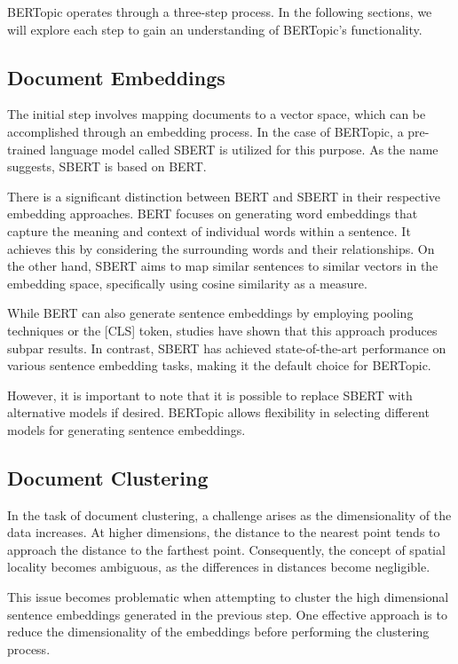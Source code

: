 \documentclass[a4paper,10pt]{report}
\begin{document}
BERTopic operates through a three-step process. In the following sections, we will explore each step to gain an understanding of BERTopic's functionality.

\subsection{Document Embeddings}
The initial step involves mapping documents to a vector space, which can be accomplished through an embedding process. In the case of BERTopic, a pre-trained language model called SBERT \cite{sbert} is utilized for this purpose. As the name suggests, SBERT is based on BERT.

There is a significant distinction between BERT and SBERT in their respective embedding approaches. BERT focuses on generating word embeddings that capture the meaning and context of individual words within a sentence. It achieves this by considering the surrounding words and their relationships. \cite{bert} On the other hand, SBERT aims to map similar sentences to similar vectors in the embedding space, specifically using cosine similarity as a measure. \cite{sbert}

While BERT can also generate sentence embeddings by employing pooling techniques or the [CLS] token, studies \cite{sbert} have shown that this approach produces subpar results. In contrast, SBERT has achieved state-of-the-art performance on various sentence embedding tasks, making it the default choice for BERTopic.

However, it is important to note that it is possible to replace SBERT with alternative models if desired. BERTopic allows flexibility in selecting different models for generating sentence embeddings. \cite{bertopic}

\subsection{Document Clustering}
In the task of document clustering, a challenge arises as the dimensionality of the data increases. At higher dimensions, the distance to the nearest point tends to approach the distance to the farthest point. Consequently, the concept of spatial locality becomes ambiguous, as the differences in distances become negligible.

This issue becomes problematic when attempting to cluster the high dimensional sentence embeddings generated in the previous step. One effective approach is to reduce the dimensionality of the embeddings before performing the clustering process.
\end{document}
